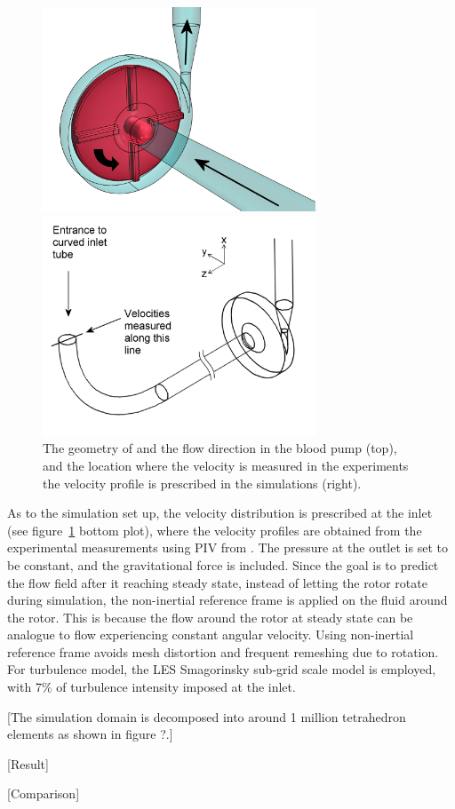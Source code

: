 \begin{figure}[htbp]
    \centering
    \begin{minipage}[c][2.5in][c]{0.9\linewidth}
        \centering
        \includegraphics[width=3.2in]{imgs/nozzle_pump/housing_and_rotor.png}
    \end{minipage}
    \begin{minipage}[c][2.5in][c]{0.9\linewidth}
        \centering
        \includegraphics[width=3.2in]{imgs/nozzle_pump/inlet_velcocity_profile_location.png}
    \end{minipage}
    \caption{The geometry of and the flow direction in the blood pump (top), and the location where the velocity is measured in the experiments the velocity profile is prescribed in the simulations (right).}
    \label{fig:pumpgeo}
\end{figure}

As to the simulation set up, the velocity distribution is prescribed at the inlet (see figure~\ref{fig:pumpgeo} bottom plot), where the velocity profiles are obtained from the experimental measurements using PIV from \cite{cpi}. The pressure at the outlet is set to be constant, and the gravitational force is included. Since the goal is to predict the flow field after it reaching steady state, instead of letting the rotor rotate during simulation, the non-inertial reference frame is applied on the fluid around the rotor. This is because the flow around the rotor at steady state can be analogue to flow experiencing constant angular velocity. Using non-inertial reference frame avoids mesh distortion and frequent remeshing due to rotation. For turbulence model, the LES Smagorinsky sub-grid scale model is employed, with 7\% of turbulence intensity imposed at the inlet. 

[The simulation domain is decomposed into around 1 million tetrahedron elements as shown in figure ?.] 

[Result]

[Comparison]